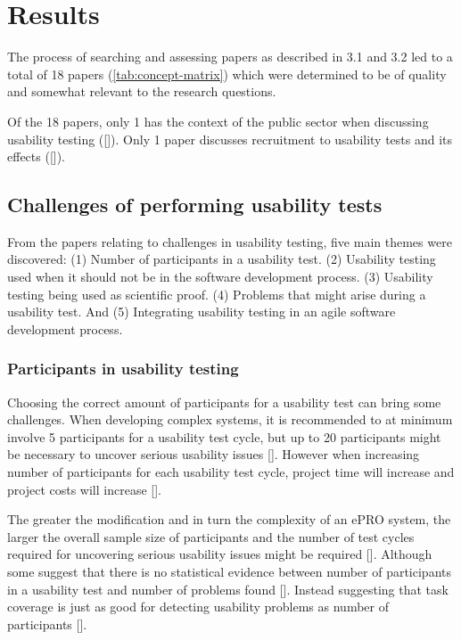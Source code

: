 \section{Results} \label{sec:results}
The process of searching and assessing papers as described in 3.1 and 3.2 led to a total of 18 papers (\autoref{tab:concept-matrix}) which were determined to be of quality and somewhat relevant to the research questions.

Of the 18 papers, only 1 has the context of the public sector when discussing usability testing ([\cite{hs_2011}]). Only 1 paper discusses recruitment to usability tests and its effects ([\cite{gl_2007}]).

\subsection{Challenges of performing usability tests}
From the papers relating to challenges in usability testing, five main themes were discovered: (1) Number of participants in a usability test. (2) Usability testing used when it should not be in the software development process. (3) Usability testing being used as scientific proof. (4) Problems that might arise during a usability test. And (5) Integrating usability testing in an agile software development process.

\subsubsection{Participants in usability testing} \label{sec:participants-in-usability-testing}
Choosing the correct amount of participants for a usability test can bring some challenges. When developing complex systems, it is recommended to at minimum involve 5 participants for a usability test cycle, but up to 20 participants might be necessary to uncover serious usability issues [\cite{ola_2019}]. However when increasing number of participants for each usability test cycle, project time will increase and project costs will increase [\cite{ola_2019}].

The greater the modification and in turn the complexity of an ePRO system, the larger the overall sample size of participants and the number of test cycles required for uncovering serious usability issues might be required [\cite{ola_2019}]. Although some suggest that there is no statistical evidence between number of participants in a usability test and number of problems found [\cite{gl_2007}]. Instead suggesting that task coverage is just as good for detecting usability problems as number of participants [\cite{gl_2007}].

